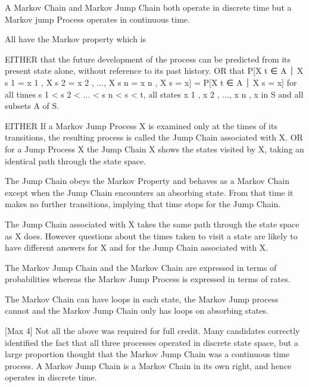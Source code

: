 \documentclass[a4paper,12pt]{article}
\begin{document}
A Markov Chain and Markov Jump Chain both operate in discrete time but a Markov jump
Process operates in continuous time.

All have the Markov property which is

EITHER that the future development of the process can be predicted from its present state
alone, without reference to its past history.
OR that
P[X t ∈ A ⏐ X s 1 = x 1 , X s 2 = x 2 , ..., X s n = x n , X s = x] = P[X t ∈ A ⏐ X s = x]
for all times s 1 < s 2 < ... < s n < s < t, all states x 1 , x 2 , ..., x n , x in S and all subsets A of S.

EITHER If a Markov Jump Process X is examined only at the times of its transitions, the
resulting process is called the Jump Chain associated with X.
OR for a Jump Process X the Jump Chain X shows the states visited by X, taking an identical
path through the state space.

The Jump Chain obeys the Markov Property and behaves as a Markov Chain except when the
Jump Chain encounters an absorbing state. From that time it makes no further transitions,
implying that time stops for the Jump Chain.

The Jump Chain associated with X takes the same path through the state space as X does.
However questions about the times taken to visit a state are likely to have different answers
for X and for the Jump Chain associated with X.

The Markov Jump Chain and the Markov Chain are expressed in terms of probabilities
whereas the Markov Jump Process is expressed in terms of rates.

The Markov Chain can have loops in each state, the Markov Jump process cannot and the
Markov Jump Chain only has loops on absorbing states.

[Max 4]
Not all the above was required for full credit. Many candidates correctly
identified the fact that all three processes operated in discrete state space,
but a large proportion thought that the Markov Jump Chain was a continuous
time process. A Markov Jump Chain is a Markov Chain in its own right, and
hence operates in discrete time.
\end{document}
